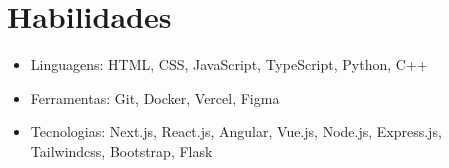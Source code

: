 \section{Habilidades}
    \resumeSubHeadingListStart

        
        \begin{itemize}[leftmargin=0.4in]
            \itemsep-0.4em 
            
        	\item{\small{Linguagens: HTML, CSS, JavaScript, TypeScript, Python, C++}}
            \item{\small{Ferramentas: Git, Docker, Vercel, Figma}}
            \item{\small{Tecnologias: Next.js, React.js, Angular, Vue.js, Node.js, Express.js, Tailwindcss, Bootstrap, Flask} }
            
        \end{itemize}
        
        

    
    \resumeSubHeadingListEnd
    